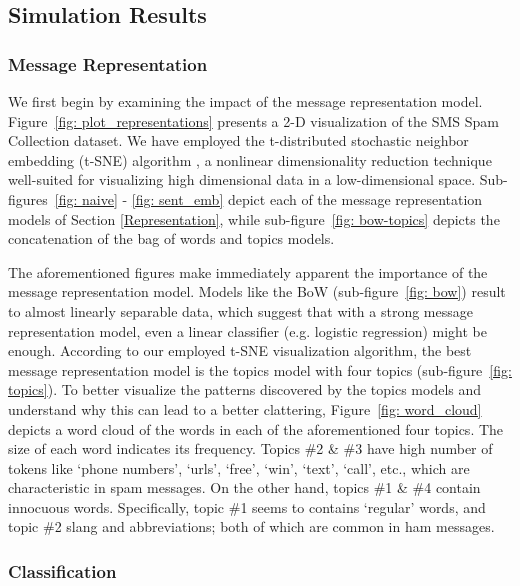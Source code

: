 \documentclass[letterpaper]{article}
\begin{document}
\subsection{Simulation Results}  \label{Simulation Results}

\subsubsection{Message Representation}  \label{Representation Results}

We first begin by examining the impact of the message representation model. Figure~\ref{fig: plot_representations} presents a 2-D visualization of the SMS Spam Collection dataset. We have employed the t-distributed stochastic neighbor embedding (t-SNE) algorithm \cite{maaten2008visualizing}, a nonlinear dimensionality reduction technique well-suited for visualizing high dimensional data in a low-dimensional space. Sub-figures~\ref{fig: naive} - \ref{fig: sent_emb} depict each of the message representation models of Section \ref{Representation}, while sub-figure~\ref{fig: bow-topics} depicts the concatenation of the bag of words and topics models.

The aforementioned figures make immediately apparent the importance of the message representation model. Models like the BoW (sub-figure~\ref{fig: bow}) result to almost linearly separable data, which suggest that with a strong message representation model, even a linear classifier (e.g. logistic regression) might be enough. According to our employed t-SNE visualization algorithm, the best message representation model is the topics model with four topics (sub-figure~\ref{fig: topics}). To better visualize the patterns discovered by the topics models and understand why this can lead to a better clattering, Figure~\ref{fig: word_cloud} depicts a word cloud of the words in each of the aforementioned four topics. The size of each word indicates its frequency. Topics \#2 \& \#3 have high number of tokens like `phone numbers', `urls', `free', `win', `text', `call', etc., which are characteristic in spam messages. On the other hand, topics \#1 \& \#4 contain innocuous words. Specifically, topic \#1 seems to contains `regular' words, and topic \#2 slang and abbreviations; both of which are common in ham messages.

\subsubsection{Classification}  \label{Classification Results}
\end{document}
